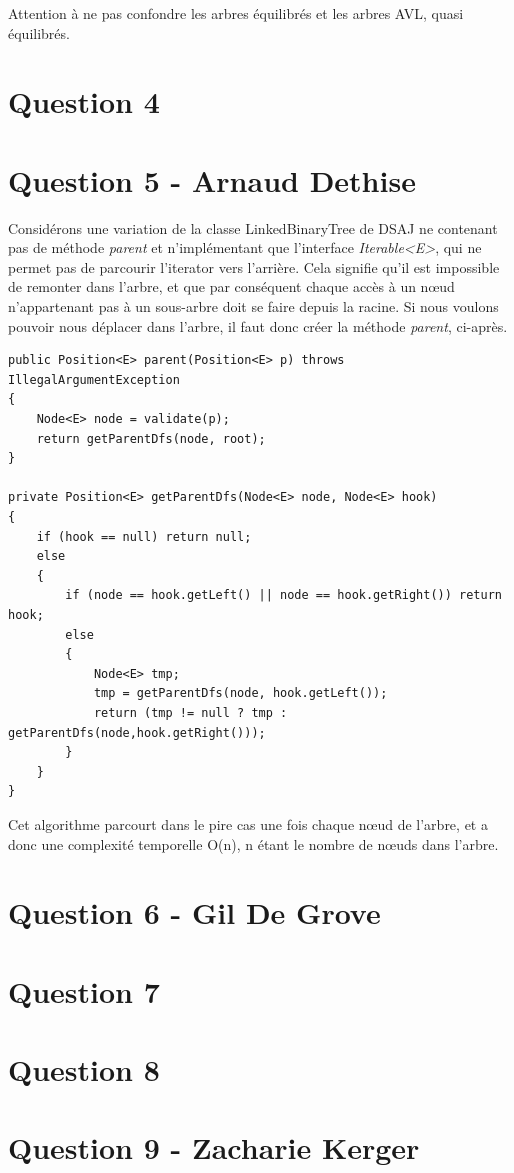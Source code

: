 \documentclass[10pt,a4paper]{article}
\begin{document}
	Attention à ne pas confondre les arbres équilibrés et les arbres AVL, quasi équilibrés.


\section*{Question 4}
\section*{Question 5 - Arnaud Dethise}

	Considérons une variation de la classe LinkedBinaryTree de DSAJ ne contenant pas de méthode \textit{parent} et n'implémentant que l'interface \textit{Iterable<E>}, qui ne permet pas de parcourir l'iterator vers l'arrière.
	Cela signifie qu'il est impossible de remonter dans l'arbre, et que par conséquent chaque accès à un nœud n'appartenant pas à un sous-arbre doit se faire depuis la racine.
	Si nous voulons pouvoir nous déplacer dans l'arbre, il faut donc créer la méthode \textit{parent}, ci-après.
	
	\begin{lstlisting}
public Position<E> parent(Position<E> p) throws IllegalArgumentException
{
	Node<E> node = validate(p);
	return getParentDfs(node, root);
}

private Position<E> getParentDfs(Node<E> node, Node<E> hook)
{
	if (hook == null) return null;
	else
	{
		if (node == hook.getLeft() || node == hook.getRight()) return hook;
		else
		{
			Node<E> tmp;
			tmp = getParentDfs(node, hook.getLeft());
			return (tmp != null ? tmp : getParentDfs(node,hook.getRight()));
		}
	}
}
	\end{lstlisting}
	
	Cet algorithme parcourt dans le pire cas une fois chaque nœud de l'arbre, et a donc une complexité temporelle O(n), n étant le nombre de nœuds dans l'arbre.

\section*{Question 6 - Gil De Grove}

\section*{Question 7}
\section*{Question 8}
\clearpage
\section*{Question 9 - Zacharie Kerger}
\end{document}

